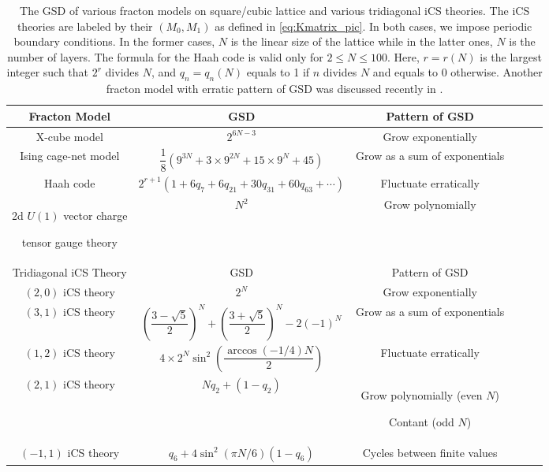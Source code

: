 \documentclass[aps,prb,twocolumn,superscriptaddress,floatfix,10pt,nofootinbib]{revtex4-2}
\theoremstyle{definition}
\begin{document}
\renewcommand{\arraystretch}{1.4} 
\begin{table*}    
\centering
    \begin{tabular}{|c|c|c|c|c|c|}
         \hline
         Fracton Model & GSD & Pattern of GSD
         \\
         \hline
         X-cube model \cite{Vijay:2016phm} & $2^{6N-3}$ \cite{Vijay:2016phm} & Grow exponentially
         \\
         \hline
         Ising cage-net model \cite{Prem:2018jsn} & $\dfrac{1}{8}\left(9^{3N}+3\times 9^{2N}+15\times 9^N+45\right)$ \cite{Ma_2023} & Grow as a sum of exponentials
         \\
         \hline
        Haah code \cite{Haah:2011drr} &  $2^{r+1}(1+6q_7+6q_{21}+30q_{31}+60q_{63}+\cdots)$ \cite{Haah:2011drr} & Fluctuate erratically
         \\
         \hline
         \makecell{ 2d $U(1)$ vector charge\vspace{1pt}
         \\
         tensor
         gauge theory \cite{Xu_2006,Pretko:2016kxt,Pretko:2016lgv} }  & {$N^2$  \cite{Gorantla:2022ssr}} & Grow polynomially
         \\
         \hline 
         \noalign{\vspace{\normalbaselineskip}}
         \hline
         Tridiagonal iCS Theory & GSD & Pattern of GSD
         \\
         \hline
         $(2,0)$ iCS theory &$2^N$ & Grow exponentially
         \\
         \hline
         $(3,1)$ iCS theory & $\left(\dfrac{3-\sqrt{5}}{2}\right)^N+\left(\dfrac{3+\sqrt{5}}{2}\right)^N-2(-1)^N$ &   Grow as a sum of exponentials
         \\
         \hline
         $(1,2)$ iCS theory & $4\times2^N\sin^2\left(\dfrac{\arccos(-1/4) N}{2}\right)$ & Fluctuate erratically
         \\
         \hline
        $(2,1)$ iCS theory  & $Nq_2+(1-q_2)$ &
        \makecell{Grow polynomially (even $N$)\vspace{1pt}
        \\
        Contant (odd $N$)}
         \\
         \hline
         $(-1,1)$ iCS theory & $q_6+4\sin^2(\pi N/6) (1-q_6)$ & Cycles between finite values
         \\
         \hline
         \end{tabular}
         \captionsetup{justification=Justified}
        \caption{ The GSD of various fracton models on square/cubic lattice and various tridiagonal iCS theories. The iCS theories are labeled by their $(M_0,M_1)$ as defined in \eqref{eq:Kmatrix_pic}. In both cases, we impose periodic boundary conditions. In the former cases, $N$ is the linear size of the lattice while in the latter ones, $N$ is the number of layers. The formula for the Haah code is valid only for $2\leq N\leq 100$. Here, $r = r(N)$ is the largest integer such that $2^r$ divides $N$, and $q_n = q_n(N)$ equals to 1 if $n$ divides $N$ and equals to 0 otherwise. Another fracton model with erratic pattern of GSD was discussed recently in \cite{Gorantla:2022pii}. }
    \label{tab:GSD}
\end{table*}
\end{document}
